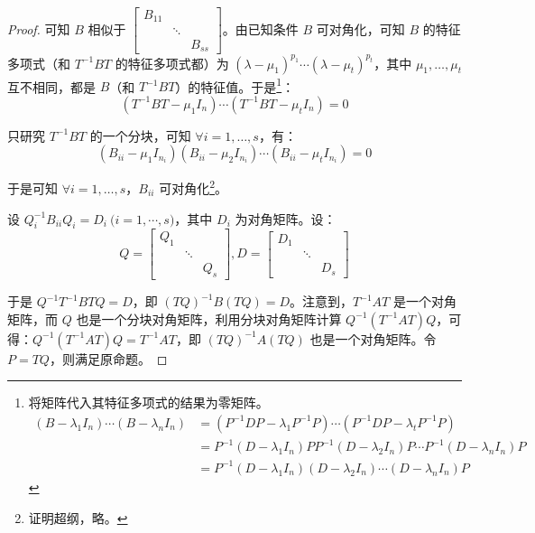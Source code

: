 \begin{proof}
	可知 $B$ 相似于 $\begin{bmatrix} B_{11} & & \\ & \ddots & \\ & & B_{ss} \end{bmatrix}$。由已知条件 $B$ 可对角化，可知 $B$ 的特征多项式（和 $T^{-1}BT$ 的特征多项式都）为 $(\lambda - \mu_1)^{p_1}\cdots(\lambda - \mu_t)^{p_t}$，其中 $\mu_1, \ldots, \mu_t$ 互不相同，都是 $B$（和 $T^{-1}BT$）的特征值。于是\footnote{将矩阵代入其特征多项式的结果为零矩阵。
	$$
	\begin{aligned}
		(B - \lambda_1 I_n) \cdots (B - \lambda_n I_n) &= (P^{-1}DP - \lambda_1 P^{-1}P) \cdots (P^{-1}DP - \lambda_t P^{-1}P)
		\\&=
		P^{-1} (D - \lambda_1 I_n) P P^{-1}(D - \lambda_2 I_n) P \cdots P^{-1} (D - \lambda_n I_n) P
		\\&=
		P^{-1}(D - \lambda_1 I_n)(D - \lambda_2 I_n) \cdots (D - \lambda_n I_n) P
	\end{aligned}
	$$
	}：
	$$
	(T^{-1}BT - \mu_1 I_n) \cdots (T^{-1}BT - \mu_t I_n) = 0
	$$

	只研究 $T^{-1}BT$ 的一个分块，可知 $\forall i = 1, \ldots, s$，有：
	$$
	(B_{ii} - \mu_1 I_{n_i})(B_{ii} - \mu_2 I_{n_i}) \cdots (B_{ii} - \mu_t I_{n_i}) = 0
	$$

	于是可知 $\forall i = 1, \ldots, s$，$B_{ii}$ 可对角化\footnote{证明超纲，略。}。

	设 $Q_i^{-1} B_{ii} Q_i = D_i \pod{i = 1, \cdots, s}$，其中 $D_i$ 为对角矩阵。设：
	$$
	Q =
	\begin{bmatrix}
		Q_1 & &
		\\
		& \ddots &
		\\
		& & Q_s
	\end{bmatrix},
	D =
	\begin{bmatrix}
		D_1 & &
		\\
		& \ddots &
		\\
		& & D_s
	\end{bmatrix}
	$$

	于是 $Q^{-1}T^{-1}BTQ = D$，即 $(TQ)^{-1}B(TQ) = D$。注意到，$T^{-1} AT$ 是一个对角矩阵，而 $Q$ 也是一个分块对角矩阵，利用分块对角矩阵计算 $Q^{-1}(T^{-1}AT)Q$，可得：$Q^{-1}(T^{-1}AT)Q = T^{-1}AT$，即 $(TQ)^{-1}A(TQ)$ 也是一个对角矩阵。令 $P = TQ$，则满足原命题。
\end{proof}
